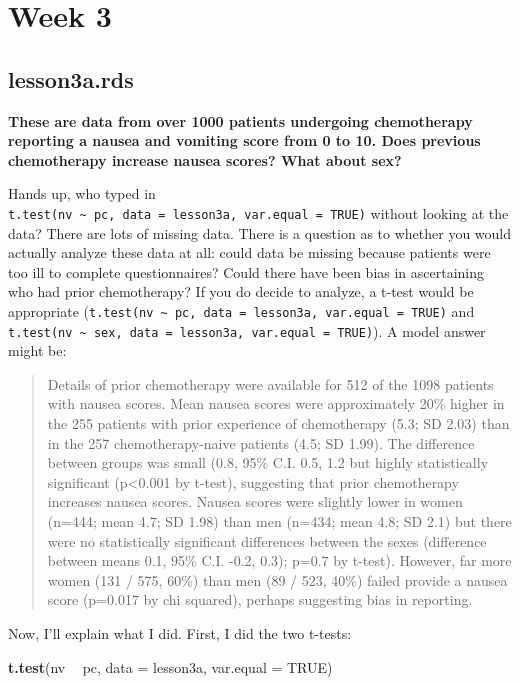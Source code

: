 \documentclass[]{book}
\newenvironment{Shaded}{\begin{snugshade}}{\end{snugshade}}
\newcommand{\DataTypeTok}[1]{\textcolor[rgb]{0.13,0.29,0.53}{#1}}
\newcommand{\KeywordTok}[1]{\textcolor[rgb]{0.13,0.29,0.53}{\textbf{#1}}}
\newcommand{\NormalTok}[1]{#1}
\newcommand{\OperatorTok}[1]{\textcolor[rgb]{0.81,0.36,0.00}{\textbf{#1}}}
\newcommand{\OtherTok}[1]{\textcolor[rgb]{0.56,0.35,0.01}{#1}}
\newcommand{\StringTok}[1]{\textcolor[rgb]{0.31,0.60,0.02}{#1}}
\begin{document}
\hypertarget{week-3-1}{%
\section{Week 3}\label{week-3-1}}

\hypertarget{lesson3a.rds}{%
\subsection{lesson3a.rds}\label{lesson3a.rds}}

\textbf{These are data from over 1000 patients undergoing chemotherapy reporting a nausea and vomiting score from 0 to 10. Does previous chemotherapy increase nausea scores? What about sex?}

Hands up, who typed in \texttt{t.test(nv\ \textasciitilde{}\ pc,\ data\ =\ lesson3a,\ var.equal\ =\ TRUE)} without looking at the data? There are lots of missing data. There is a question as to whether you would actually analyze these data at all: could data be missing because patients were too ill to complete questionnaires? Could there have been bias in ascertaining who had prior chemotherapy? If you do decide to analyze, a t-test would be appropriate (\texttt{t.test(nv\ \textasciitilde{}\ pc,\ data\ =\ lesson3a,\ var.equal\ =\ TRUE)} and \texttt{t.test(nv\ \textasciitilde{}\ sex,\ data\ =\ lesson3a,\ var.equal\ =\ TRUE)}). A model answer might be:

\begin{quote}
Details of prior chemotherapy were available for 512 of the 1098 patients with nausea scores. Mean nausea scores were approximately 20\% higher in the 255 patients with prior experience of chemotherapy (5.3; SD 2.03) than in the 257 chemotherapy-naive patients (4.5; SD 1.99). The difference between groups was small (0.8, 95\% C.I. 0.5, 1.2 but highly statistically significant (p\textless0.001 by t-test), suggesting that prior chemotherapy increases nausea scores. Nausea scores were slightly lower in women (n=444; mean 4.7; SD 1.98) than men (n=434; mean 4.8; SD 2.1) but there were no statistically significant differences between the sexes (difference between means 0.1, 95\% C.I. -0.2, 0.3); p=0.7 by t-test). However, far more women (131 / 575, 60\%) than men (89 / 523, 40\%) failed provide a nausea score (p=0.017 by chi squared), perhaps suggesting bias in reporting.
\end{quote}

Now, I'll explain what I did. First, I did the two t-tests:

\begin{Shaded}
\begin{Highlighting}[]
\KeywordTok{t.test}\NormalTok{(nv }\OperatorTok{~}\StringTok{ }\NormalTok{pc, }\DataTypeTok{data =}\NormalTok{ lesson3a, }\DataTypeTok{var.equal =} \OtherTok{TRUE}\NormalTok{)}
\end{Highlighting}
\end{Shaded}
\end{document}
